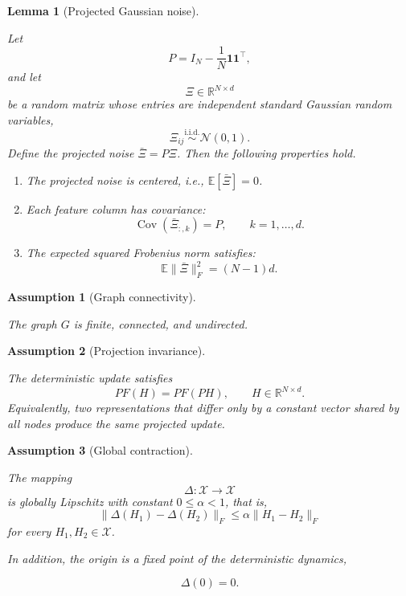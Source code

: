 \documentclass[10pt,a4paper]{amsart}
\newtheorem{lemma}{Lemma}
\newtheorem{assumption}{Assumption}
\begin{document}
\begin{lemma}[Projected Gaussian noise]
	\label{lem:projected_noise}
	
	Let
	\[
	P = I_N - \frac1N \mathbf1\mathbf1^\top,
	\]
	and let
	\[
	\Xi \in \mathbb R^{N\times d}
	\]
	be a random matrix whose entries are independent standard Gaussian random variables,
	\[
	\Xi_{ij} \stackrel{\mathrm{i.i.d.}}{\sim} \mathcal N(0,1).
	\]
	Define the projected noise $\bar\Xi = P\Xi$.
	Then the following properties hold.
	\begin{enumerate}
		\item The projected noise is centered, i.e., $\mathbb E[\bar\Xi] = 0$.
		\item Each feature column has covariance:
		\[
		\operatorname{Cov}(\bar\Xi_{:,k}) = P, \qquad k=1,\dots,d.
		\]
		\item The expected squared Frobenius norm satisfies:
		\[
		\boxed{\mathbb E\|\bar\Xi\|_F^2 = (N-1)d.}
		\]
	\end{enumerate}
\end{lemma}

\begin{assumption}[Graph connectivity]
	\label{ass:connected}
	
	The graph
	$G$
	is finite,
	connected,
	and undirected.	
\end{assumption}

\begin{assumption}[Projection invariance]
	\label{ass:projection}
	
	The deterministic update satisfies	
	\[
	PF(H)
	=
	PF(PH),
	\qquad
	H\in\mathbb R^{N\times d}.
	\]
	Equivalently, two representations that differ only by a constant vector
	shared by all nodes produce the same projected update.
	
\end{assumption}

\begin{assumption}[Global contraction]
	\label{ass:contraction}
	
	The mapping	
	\[
	\Delta:\mathcal X\rightarrow\mathcal X
	\]	
	is globally Lipschitz with constant
	\(
	0\le\alpha<1
	\),
	that is,	
	\[
	\|
	\Delta(H_1)-\Delta(H_2)
	\|_F
	\le
	\alpha
	\|
	H_1-H_2
	\|_F
	\]
	for every
	$H_1,H_2\in\mathcal X$.
	
	In addition, the origin is a fixed point of the deterministic dynamics,
	
	\[
	\boxed{\Delta(0)=0.}
	\]
	
\end{assumption}
\end{document}

